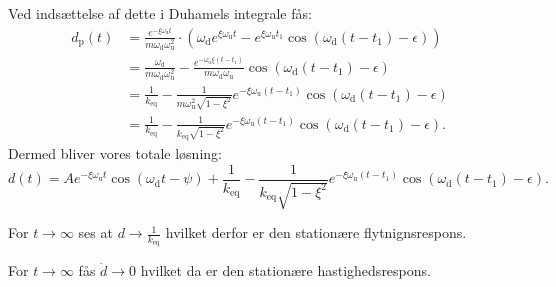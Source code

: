 \begin{derivation}
  Ved indsættelse af dette i Duhamels integrale fås:
  \begin{align*}
    d_{\mathrm{p}}(t) &= \frac{e^{- \xi \omega_{\mathrm{u}} t}}{m\omega_{\mathrm{d}} \omega_{\mathrm{u}}^2} \cdot \left( \omega_{\mathrm{d}} e^{\xi \omega_{\mathrm{u}} t } - e^{\xi \omega_{\mathrm{u}} t_1} \cos \left( \omega_{\mathrm{d}} \left( t - t_1 \right) - \epsilon \right) \right) \\
    &= \frac{\omega_{\mathrm{d}}}{m \omega_{\mathrm{d}} \omega_{\mathrm{u}}^2} -  \frac{e^{- \omega_{\mathrm{u}} \xi \left( t - t_1 \right)}}{m \omega_{\mathrm{d}} \omega_{\mathrm{u}}} \cos \left( \omega_{\mathrm{d}} \left( t - t_1 \right) - \epsilon \right) \\
    &= \frac{1}{k_{\mathrm{eq}}} - \frac{1}{m \omega_{\mathrm{u}}^2 \sqrt{1 - \xi^2}} e^{- \xi \omega_{\mathrm{u}} \left( t - t_1 \right)} \cos \left( \omega_{\mathrm{d}} \left( t - t_1 \right) - \epsilon \right) \\
    &= \frac{1}{k_{\mathrm{eq}}} - \frac{1}{k_{\mathrm{eq}} \sqrt{1 - \xi^2}} e^{- \xi \omega_{\mathrm{u}} \left( t - t_1 \right)} \cos \left( \omega_{\mathrm{d}} \left( t - t_1 \right) - \epsilon \right)
  .\end{align*}
  Dermed bliver vores totale løsning:
  \[ 
    d(t) = Ae^{-\xi \omega_{\mathrm{u}} t } \cos \left( \omega_{\mathrm{d}} t - \psi \right) + \frac{1}{k_{\mathrm{eq}}} - \frac{1}{k_{\mathrm{eq}} \sqrt{1 - \xi^2}} e^{-\xi \omega_{\mathrm{u}} \left( t - t_1 \right)} \cos \left( \omega_{\mathrm{d}} \left( t - t_1 \right) - \epsilon \right)
  .\]
  
  For $t \to \infty$ ses at $d \to \frac{1}{k_{\mathrm{eq}}}$ hvilket derfor er den stationære flytnignsrespons.

  For $t \to \infty$ fås $\dot{d} \to 0$ hvilket da er den stationære hastighedsrespons.
\end{derivation}


